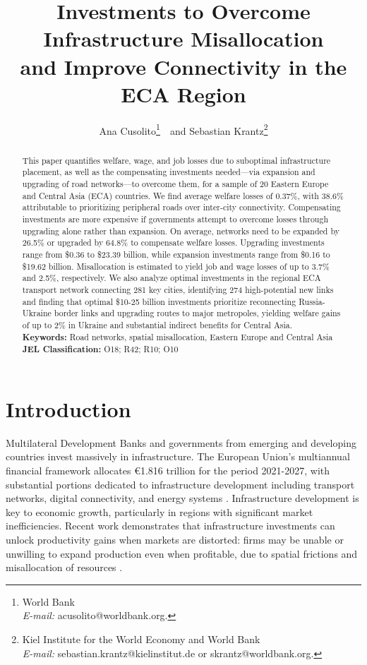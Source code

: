 \documentclass[a4paper]{article}
\title{Investments to Overcome Infrastructure Misallocation\\and Improve Connectivity in the ECA Region}
\author{Ana Cusolito\footnote{World Bank\\ \hphantom{aaa}\textit{E-mail:} acusolito@worldbank.org.}\ \ and Sebastian Krantz\footnote{Kiel Institute for the World Economy and World Bank\\ \hphantom{aaa}\textit{E-mail:} sebastian.krantz@kielinstitut.de or skrantz@worldbank.org.}}
\begin{document}
\maketitle


\begin{abstract}

\noindent
This paper quantifies welfare, wage, and job losses due to suboptimal infrastructure placement, as well as the compensating investments needed---via expansion and upgrading of road networks---to overcome them, for a sample of 20 Eastern Europe and Central Asia (ECA) countries. We find average welfare losses of 0.37\%, with 38.6\% attributable to prioritizing peripheral roads over inter-city connectivity. Compensating investments are more expensive if governments attempt to overcome losses through upgrading alone rather than expansion. On average, networks need to be expanded by 26.5\% or upgraded by 64.8\% to compensate welfare losses. Upgrading investments range from \$0.36 to \$23.39 billion, while expansion investments range from \$0.16 to \$19.62 billion. Misallocation is estimated to yield job and wage losses of up to 3.7\% and 2.5\%, respectively. We also analyze optimal investments in the regional ECA transport network connecting 281 key cities, identifying 274 high-potential new links and finding that optimal \$10-25 billion investments prioritize reconnecting Russia-Ukraine border links and upgrading routes to major metropoles, yielding welfare gains of up to 2\% in Ukraine and substantial indirect benefits for Central Asia. 
\\ [0.7em]
\noindent \textbf{Keywords:} Road networks, spatial misallocation, Eastern Europe and Central Asia\\
\textbf{JEL Classification:} O18; R42; R10; O10
\end{abstract}



\section{Introduction} 

Multilateral Development Banks and governments from emerging and developing countries invest massively in infrastructure. The European Union's multiannual financial framework allocates €1.816 trillion for the period 2021-2027, with substantial portions dedicated to infrastructure development including transport networks, digital connectivity, and energy systems \citep{eu2021mff}. Infrastructure development is key to economic growth, particularly in regions with significant market inefficiencies. Recent work demonstrates that infrastructure investments can unlock productivity gains when markets are distorted: firms may be unable or unwilling to expand production even when profitable, due to spatial frictions and misallocation of resources \citep{hornbeck2024growth, cockriel2025aggregate}. \newline 
\end{document}
